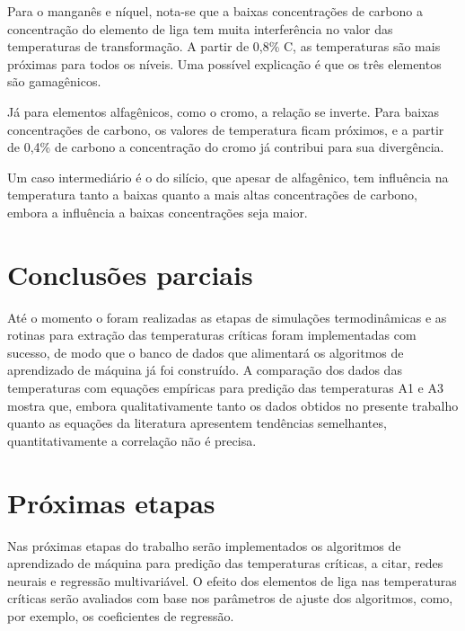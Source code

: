 \documentclass[brazil,tese,epusp]{usp}
\begin{document}
Para o manganês e níquel, nota-se que a baixas concentrações de carbono a concentração do elemento de liga tem muita interferência no valor das temperaturas de transformação. A partir de 0,8\% C, as temperaturas são mais próximas para todos os níveis. Uma possível explicação é que os três elementos são gamagênicos.

Já para elementos alfagênicos, como o cromo, a relação se inverte. Para baixas concentrações de carbono, os valores de temperatura ficam próximos, e a partir de 0,4\% de carbono a concentração do cromo já contribui para sua divergência.

Um caso intermediário é o do silício, que apesar de alfagênico, tem influência na temperatura tanto a baixas quanto a mais altas concentrações de carbono, embora a influência a baixas concentrações seja maior.

\chapter{Conclusões parciais}

Até o momento o foram realizadas as etapas de simulações termodinâmicas e as rotinas para extração das temperaturas críticas foram implementadas com sucesso, de modo que o banco de dados que alimentará os algoritmos de aprendizado de máquina já foi construído. A comparação dos dados das temperaturas com equações empíricas para predição das temperaturas A1 e A3 mostra que, embora qualitativamente tanto os dados obtidos no presente trabalho quanto as equações da literatura apresentem tendências semelhantes, quantitativamente a correlação não é precisa.

\chapter{Próximas etapas}

Nas próximas etapas do trabalho serão implementados os algoritmos de aprendizado de máquina para predição das temperaturas críticas, a citar, redes neurais e regressão multivariável. O efeito dos elementos de liga nas temperaturas críticas serão avaliados com base nos parâmetros de ajuste dos algoritmos, como, por exemplo, os coeficientes de regressão.




\label{an:diag_bin}
\end{document}
